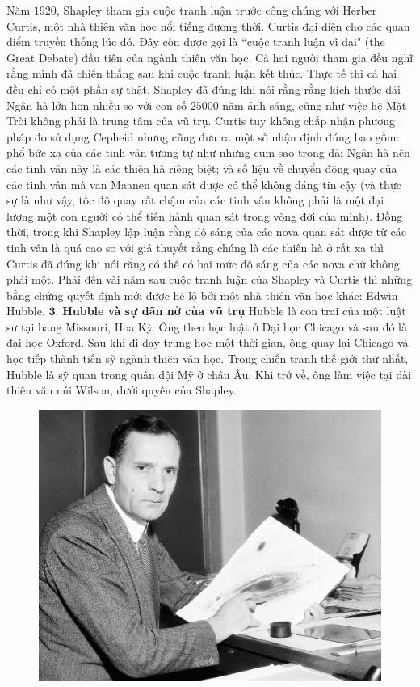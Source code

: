 \begin{multicols}{2}
	\vskip 0.1cm
	Năm $1920$, Shapley tham gia cuộc tranh luận trước công chúng với Herber Curtis, một nhà thiên văn học nổi tiếng đương thời. Curtis đại diện cho các quan điểm truyền thống lúc đó. Đây còn được gọi là ``cuộc tranh luận vĩ đại" (the Great Debate) đầu tiên của ngành thiên văn học. Cả hai người tham gia đều nghĩ rằng mình đã chiến thắng sau khi cuộc tranh luận kết thúc. Thực tế thì cả hai đều chỉ có một phần sự thật. Shapley đã đúng khi nói rằng rằng kích thước dải Ngân hà lớn hơn nhiều so với con số $25 000$ năm ánh sáng, cũng như việc hệ Mặt Trời không phải là trung tâm của vũ trụ. Curtis tuy không chấp nhận phương pháp đo sử dụng Cepheid nhưng cũng đưa ra một số nhận định đúng bao gồm: phổ bức xạ của các tinh vân tương tự như những cụm sao trong dải Ngân hà nên các tinh vân này là các thiên hà riêng biệt; và số liệu về chuyển động quay của các tinh vân mà van Maanen quan sát được có thể không đáng tin cậy (và thực sự là như vậy, tốc độ quay rất chậm của các tinh vân không phải là một đại lượng một con người có thể tiến hành quan sát trong vòng đời của mình). Đồng thời, trong khi Shapley lập luận rằng độ sáng của các nova quan sát được từ các tinh vân là quá cao so với giả thuyết rằng chúng là các thiên hà ở rất xa thì Curtis đã đúng khi nói rằng có thể có hai mức độ sáng của các nova chứ không phải một. Phải đến vài năm sau cuộc tranh luận của Shapley và Curtis thì những bằng chứng quyết định mới được hé lộ bởi một nhà thiên văn học khác: Edwin Hubble.
	\vskip 0.1cm
	$\pmb{3.}$ \textbf{\color{timhieukhoahoc}Hubble và sự dãn nở của vũ trụ}
	\vskip 0.1cm
	Hubble là con trai của một luật sư tại bang Missouri, Hoa Kỳ. Ông theo học luật ở Đại học Chicago và sau đó là đại học Oxford. Sau khi đi dạy trung học một thời gian, ông quay lại Chicago và học tiếp thành tiến sỹ ngành thiên văn học. Trong chiến tranh thế giới thứ nhất, Hubble là sỹ quan trong quân đội Mỹ ở châu Âu. Khi trở về, ông làm việc tại đài thiên văn núi Wilson, dưới quyền của Shapley.
	\begin{figure}[H]
		\vspace*{5pt}
		\centering
		\captionsetup{labelformat= empty, justification=centering}
		\includegraphics[width= 1\linewidth]{9}

\end{figure}
\end{multicols}
